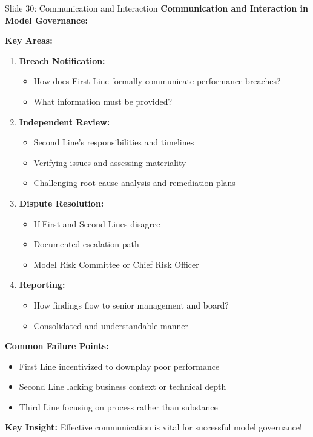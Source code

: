 \documentclass[8pt]{beamer}
\begin{document}
	\begin{frame}{Slide 30: Communication and Interaction}
		\fontsize{6.5}{7.5}\selectfont
		\textbf{Communication and Interaction in Model Governance:}
		
		\vspace{0.1cm}
		\textbf{Key Areas:}
		\begin{enumerate}
			\item \textbf{Breach Notification:}
			\begin{itemize}
				\item How does First Line formally communicate performance breaches?
				\item What information must be provided?
			\end{itemize}
			\item \textbf{Independent Review:}
			\begin{itemize}
				\item Second Line's responsibilities and timelines
				\item Verifying issues and assessing materiality
				\item Challenging root cause analysis and remediation plans
			\end{itemize}
			\item \textbf{Dispute Resolution:}
			\begin{itemize}
				\item If First and Second Lines disagree
				\item Documented escalation path
				\item Model Risk Committee or Chief Risk Officer
			\end{itemize}
			\item \textbf{Reporting:}
			\begin{itemize}
				\item How findings flow to senior management and board?
				\item Consolidated and understandable manner
			\end{itemize}
		\end{enumerate}
		
		\vspace{0.1cm}
		\textbf{Common Failure Points:}
		\begin{itemize}
			\item First Line incentivized to downplay poor performance
			\item Second Line lacking business context or technical depth
			\item Third Line focusing on process rather than substance
		\end{itemize}
		
		\textcolor{myblue}{\textbf{Key Insight:}} Effective communication is \textcolor{myblue}{vital for successful model governance}!
	\end{frame}
	
\end{document}

